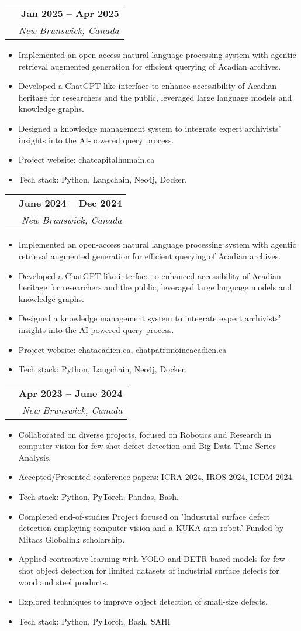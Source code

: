 \documentclass[letterpaper,11pt]{article}
\makeatletter
\newcommand{\resumeItem}[1]{
  \item\small{
    {#1 \vspace{-2pt}}
  }
}
\newcommand{\resumeExperienceSubheading}[4]{
  \vspace{-4pt}\item
    \begin{tabular*}{1.0\textwidth}[t]{@{}p{0.72\textwidth}@{\extracolsep{\fill}}r@{}}
      \textbf{\raggedright #3} & \textbf{\small #2} \\
      \textit{\small\raggedright #1} & \textit{\small #4} \\
    \end{tabular*}\vspace{-7pt}
}
\newcommand{\resumeItemListStart}{\begin{itemize}[label=\textbullet, itemsep=0.1em, topsep=0.1em, parsep=0.5pt]}
\newcommand{\resumeItemListEnd}{\end{itemize}\vspace{0pt}}
\makeatother
\begin{document}
\resumeExperienceSubheading
{CFRIA, University of Moncton}{Jan 2025 – Apr 2025}
{Research Assistant}{New Brunswick, Canada}
\resumeItemListStart
\resumeItem{Implemented an open-access natural language processing system with agentic retrieval augmented generation for efficient querying of Acadian archives.}
\resumeItem{Developed a ChatGPT-like interface to enhance accessibility of Acadian heritage for researchers and the public, leveraged large language models and knowledge graphs.}
\resumeItem{Designed a knowledge management system to integrate expert archivists' insights into the AI-powered query process.}
\resumeItem{Project website: chatcapitalhumain.ca}
\resumeItem{Tech stack: Python, Langchain, Neo4j, Docker.}
\resumeItemListEnd


\resumeExperienceSubheading
{Centre d'études acadiennes Anselme-Chiasson (CEAAC)}{June 2024 – Dec 2024}
{Research Assistant}{New Brunswick, Canada}
\resumeItemListStart
\resumeItem{Implemented an open-access natural language processing system with agentic retrieval augmented generation for efficient querying of Acadian archives.}
\resumeItem{Developed a ChatGPT-like interface to enhanced accessibility of Acadian heritage for researchers and the public, leveraged large language models and knowledge graphs.}
\resumeItem{Designed a knowledge management system to integrate expert archivists' insights into the AI-powered query process.}
\resumeItem{Project website: chatacadien.ca, chatpatrimoineacadien.ca}
\resumeItem{Tech stack: Python, Langchain, Neo4j, Docker.}
\resumeItemListEnd


\resumeExperienceSubheading
{CFRIA, University of Moncton}{Apr 2023 – June 2024}
{Research Assistant}{New Brunswick, Canada}
\resumeItemListStart
\resumeItem{Collaborated on diverse projects, focused on Robotics and Research in computer vision for few-shot defect detection and Big Data Time Series Analysis.}
\resumeItem{Accepted/Presented conference papers: ICRA 2024, IROS 2024, ICDM 2024.}
\resumeItem{Tech stack: Python, PyTorch, Pandas, Bash.}
\resumeItem{Completed end-of-studies Project focused on 'Industrial surface defect detection employing computer vision and a KUKA arm robot.' Funded by Mitacs Globalink scholarship.}
\resumeItem{Applied contrastive learning with YOLO and DETR based models for few-shot object detection for limited datasets of industrial surface defects for wood and steel products.}
\resumeItem{Explored techniques to improve object detection of small-size defects.}
\resumeItem{Tech stack: Python, PyTorch, Bash, SAHI}
\resumeItemListEnd
\end{document}
